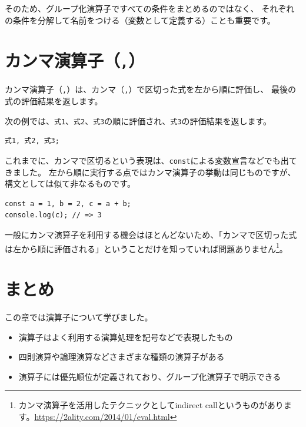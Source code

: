 そのため、グループ化演算子ですべての条件をまとめるのではなく、
それぞれの条件を分解して名前をつける（変数として定義する）ことも重要です。

\hypertarget{comma-operator}{%
\section{\texorpdfstring{カンマ演算子（\texttt{,}）}{カンマ演算子（,）}}\label{comma-operator}}

カンマ演算子（\texttt{,}）は、カンマ（\texttt{,}）で区切った式を左から順に評価し、
最後の式の評価結果を返します。

次の例では、\texttt{式1}、\texttt{式2}、\texttt{式3}の順に評価され、\texttt{式3}の評価結果を返します。

\begin{lstlisting}
式1, 式2, 式3;
\end{lstlisting}

これまでに、カンマで区切るという表現は、\texttt{const}による変数宣言などでも出てきました。
左から順に実行する点ではカンマ演算子の挙動は同じものですが、構文としては似て非なるものです。

\begin{lstlisting}
const a = 1, b = 2, c = a + b;
console.log(c); // => 3
\end{lstlisting}

一般にカンマ演算子を利用する機会はほとんどないため、「カンマで区切った式は左から順に評価される」ということだけを知っていれば問題ありません\footnote{カンマ演算子を活用したテクニックとしてindirect
  callというものがあります。\url{https://2ality.com/2014/01/eval.html}}。

\hypertarget{conclusion}{%
\section{まとめ}\label{conclusion}}

この章では演算子について学びました。

\begin{itemize}
\item
  演算子はよく利用する演算処理を記号などで表現したもの
\item
  四則演算や論理演算などさまざまな種類の演算子がある
\item
  演算子には優先順位が定義されており、グループ化演算子で明示できる
\end{itemize}
